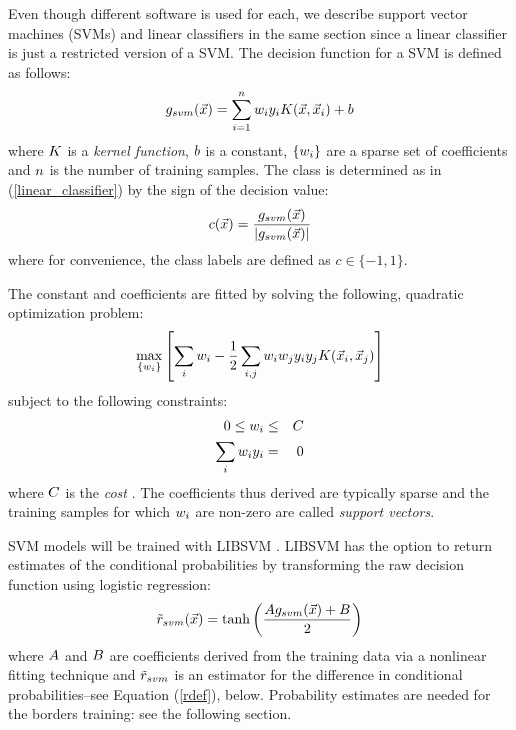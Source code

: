 Even though different software is used for each, 
we describe support vector machines (SVMs) and linear classifiers in the same
section since a linear classifier is just a restricted version of a SVM.
The decision function for a SVM is defined as follows:
\begin{equation}
	g_{svm}(\vec {x}) = \sum_{i=1}^n w_i y_i K (\vec {x}, \vec {x}_i) + b
	\label{svm_decision}
\end{equation}
where $K$ is a {\it kernel function}, $b$ is a
constant, $\lbrace w_i \rbrace$ are a sparse set of coefficients
and $n$ is the number of training samples.
The class is determined as in (\ref{linear_classifier}) by the sign of the decision value:
\begin{equation}
	c(\vec {x}) = \frac{g_{svm}(\vec {x})}{|g_{svm}(\vec {x})|}
	\label{class_value}
\end{equation}
where for convenience, the class labels are defined as
$c \in \lbrace -1, 1 \rbrace$.

The constant and coefficients are fitted by solving the following, quadratic
optimization problem:
\begin{equation}
	\max_{\lbrace w_i \rbrace} \left [ \sum_i w_i 
	- \frac{1}{2} \sum_{i, j} w_i w_j y_i y_j K(\vec {x}_i, \vec {x}_j) \right ] \label{dual_problem}
\end{equation}
subject to the following constraints:
\begin{eqnarray}
	0 \le w_i & \le & C \label{constraint1} \\
	\sum_i w_i y_i & = & 0 \label{constraint2}
\end{eqnarray}
where $C$ is the {\it cost} \citep{Mueller_etal2001,Chang_Lin2011}.
The coefficients thus derived are typically sparse and the training samples
for which $w_i$ are non-zero are called {\it support vectors}.

SVM models will be trained with LIBSVM \citep{Chang_Lin2011}.
LIBSVM has the option to return estimates of the conditional 
probabilities by transforming the raw decision function using logistic regression:
\begin{equation}
	\tilde r_{svm}(\vec {x}) = \tanh \left (\frac{A g_{svm}(\vec {x})+ B}{2} \right )
	\label{svm_prob}
\end{equation}
where $A$ and $B$ are coefficients derived from
the training data via a nonlinear fitting technique \citep{Platt1999,Lin_etal2007} and $\tilde r_{svm}$ is an estimator for the difference in conditional
probabilities--see Equation (\ref{rdef}), below.
Probability estimates are needed for the borders training: see the following
section.

